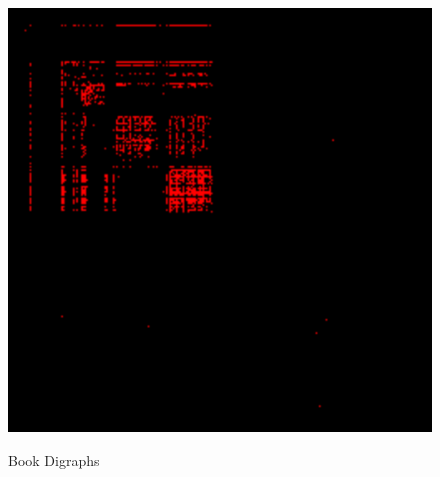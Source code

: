 \documentclass[12pt,a4paper]{article}
\begin{document}
\begin{figure}[!h]
{		\includegraphics[scale=0.25]{images/AliceInWonderLand.png}
    }
    \caption{Book Digraphs}
    \label{ref_label_overall}
\end{figure}
\end{document}
